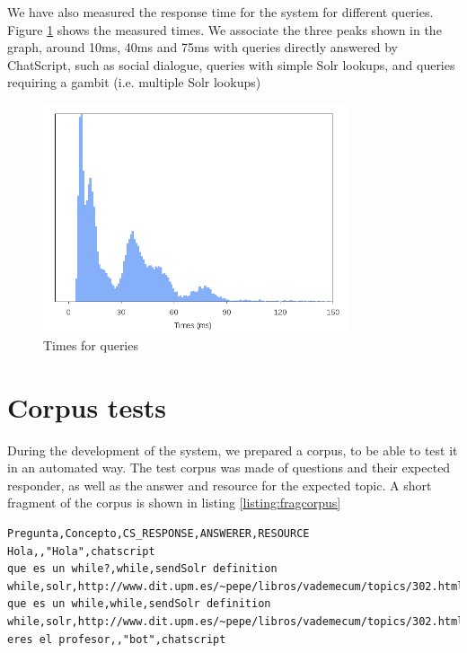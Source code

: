 We have also measured the response time for the system for different queries. Figure \ref{fig:times-demos} shows the measured times. We associate the three peaks shown in the graph, around 10ms, 40ms and 75ms with queries directly answered by ChatScript, such as social dialogue, queries with simple Solr lookups, and queries requiring a gambit (i.e. multiple Solr lookups)

\begin{figure}[!htbp]
    \centering
    \includegraphics[width=0.8\textwidth]{img/test/times.png}
    \caption{Times for queries}
    \label{fig:times-demos}
\end{figure}

\section{Corpus tests}

During the development of the system, we prepared a corpus, to be able to test it in an automated way. The test corpus was made of questions and their expected responder, as well as the answer and resource for the expected topic. A short fragment of the corpus is shown in listing \ref{listing:fragcorpus}

\begin{center} 
  \begin{lstlisting}[language={}, captionpos=b, caption=Fragment of the test corpus built for the system., label=listing:fragcorpus]   
Pregunta,Concepto,CS_RESPONSE,ANSWERER,RESOURCE
Hola,,"Hola",chatscript
que es un while?,while,sendSolr definition while,solr,http://www.dit.upm.es/~pepe/libros/vademecum/topics/302.html
que es un while,while,sendSolr definition while,solr,http://www.dit.upm.es/~pepe/libros/vademecum/topics/302.html
eres el profesor,,"bot",chatscript
  \end{lstlisting}
\end{center}

